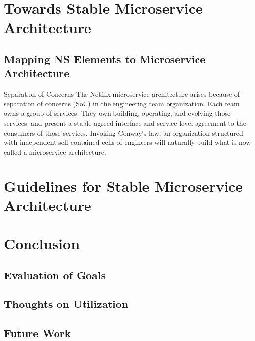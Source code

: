 \documentclass[thesis=M,english,hidelinks]{FITthesis}[2012/10/20]
\begin{document}
% 
% 

\chapter{Towards Stable Microservice Architecture}
\label{sec:msa_compliance}
\section{Mapping NS Elements to Microservice Architecture}


Separation of Concerns
The Netflix microservice architecture arises because of separation of concerns (SoC) in the engineering team organization. Each team owns a group of services. They own building, operating, and evolving those services, and present a stable agreed interface and service level agreement to the consumers of those services. Invoking Conway’s law, an organization structured with independent self-contained cells of engineers will naturally build what is now called a microservice architecture.


\chapter{Guidelines for Stable Microservice Architecture}
\label{sec:guidelines}

% 
% 
\chapter{Conclusion}
\label{sec:conclusion}
\section{Evaluation of Goals}

\section{Thoughts on Utilization}

\section{Future Work}
\end{document}
